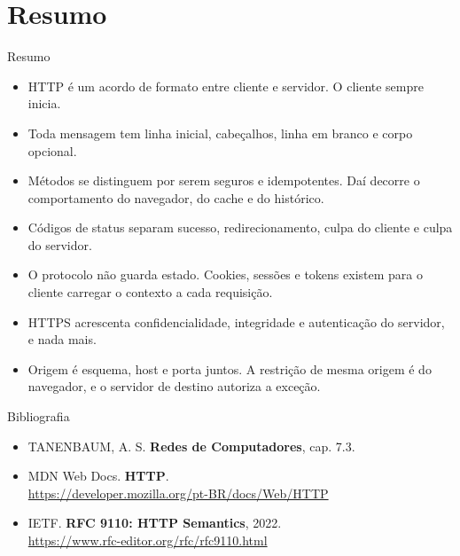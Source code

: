 \documentclass{beamer}
\begin{document}
\section*{Resumo}

\begin{frame}{Resumo}
  \small
  \begin{itemize}
    \item HTTP é um acordo de formato entre cliente e servidor. O cliente sempre
          inicia.
    \item Toda mensagem tem linha inicial, cabeçalhos, linha em branco e corpo
          opcional.
    \item Métodos se distinguem por serem seguros e idempotentes. Daí decorre o
          comportamento do navegador, do cache e do histórico.
    \item Códigos de status separam sucesso, redirecionamento, culpa do cliente
          e culpa do servidor.
    \item O protocolo não guarda estado. Cookies, sessões e tokens existem para
          o cliente carregar o contexto a cada requisição.
    \item HTTPS acrescenta confidencialidade, integridade e autenticação do
          servidor, e nada mais.
    \item Origem é esquema, host e porta juntos. A restrição de mesma origem é
          do navegador, e o servidor de destino autoriza a exceção.
  \end{itemize}
\end{frame}

\begin{frame}{Bibliografia}
  \begin{itemize}
    \item TANENBAUM, A. S. \textbf{Redes de Computadores}, cap. 7.3.
    \item MDN Web Docs. \textbf{HTTP}. \\
          \url{https://developer.mozilla.org/pt-BR/docs/Web/HTTP}
    \item IETF. \textbf{RFC 9110: HTTP Semantics}, 2022. \\
          \url{https://www.rfc-editor.org/rfc/rfc9110.html}
  \end{itemize}
\end{frame}
\end{document}
